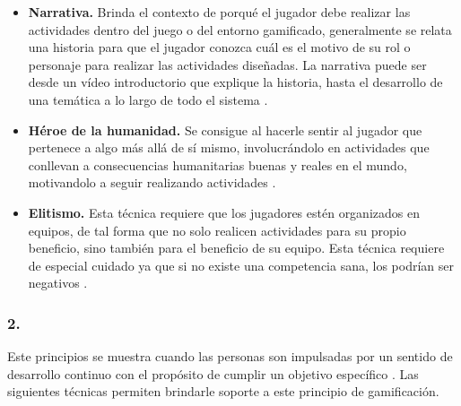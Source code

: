     \begin{itemize}
    \item
    {\bf Narrativa.}
        Brinda el contexto de porqué el jugador debe realizar las actividades dentro del juego o
        del entorno gamificado, generalmente se relata una historia para que el jugador conozca
        cuál es el motivo de su rol o personaje para realizar las actividades diseñadas.
        La narrativa puede ser desde un vídeo introductorio que explique la historia, hasta
        el desarrollo de una temática a lo largo de todo el sistema \cite[p. 81]{Octalysis}.
        
    \item
    {\bf Héroe de la humanidad.}
        Se consigue al hacerle sentir al jugador que pertenece a algo más allá de sí mismo,
        involucrándolo en actividades que conllevan a consecuencias humanitarias buenas y reales
        en el mundo, motivandolo a seguir realizando actividades \cite[p. 82]{Octalysis}.
        
    \item
    {\bf Elitismo.}
        Esta técnica requiere que los jugadores estén organizados en equipos, de tal forma que
        no solo realicen actividades para su propio beneficio, sino también para el beneficio
        de su equipo. Esta técnica requiere de especial cuidado ya que si no existe una competencia
        sana, los podrían ser negativos \cite[p. 83]{Octalysis}.
    
    \end{itemize}
    
\subsubsection{2. \principioII} \label{subsec:principioII}
 
 Este principios se muestra cuando las personas son impulsadas por un sentido de desarrollo continuo
 con el propósito de cumplir un objetivo específico \cite[p. 91]{Octalysis}. Las siguientes técnicas
 permiten brindarle soporte a este principio de gamificación.
    
